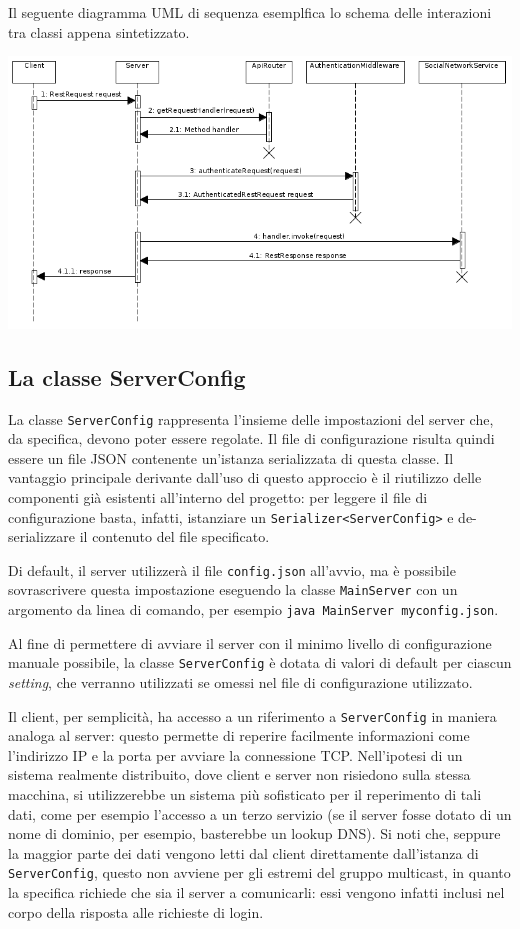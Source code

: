 \documentclass[a4paper,8pt]{article} %
\def\code#1{\texttt{#1}}
\begin{document}
\par Il seguente diagramma UML di sequenza esemplfica lo schema delle interazioni tra classi appena sintetizzato.
\par \includegraphics[width=\textwidth]{sequence.png}

\subsection{La classe ServerConfig}
La classe \code{ServerConfig} rappresenta l'insieme delle impostazioni del server che, da specifica, devono poter essere regolate.
Il file di configurazione risulta quindi essere un file JSON contenente un'istanza serializzata di questa classe. Il vantaggio principale derivante dall'uso di questo approccio è
il riutilizzo delle componenti già esistenti all'interno del progetto: per leggere il file di configurazione basta, infatti, istanziare un \code{Serializer<ServerConfig>} e de-serializzare il contenuto del file
specificato.
\par Di default, il server utilizzerà il file \code{config.json} all'avvio, ma è possibile sovrascrivere questa impostazione eseguendo la classe \code{MainServer} con un argomento da linea di comando, per esempio
\code{java MainServer myconfig.json}.

\par Al fine di permettere di avviare il server con il minimo livello di configurazione manuale possibile, la classe \code{ServerConfig} è dotata di valori di default per ciascun \emph{setting}, che verranno utilizzati
se omessi nel file di configurazione utilizzato.

\par Il client, per semplicità, ha accesso a un riferimento a \code{ServerConfig} in maniera analoga al server: questo permette di reperire facilmente informazioni come l'indirizzo IP e la porta per avviare la connessione TCP.
Nell'ipotesi di un sistema realmente distribuito, dove client e server non risiedono sulla stessa macchina, si utilizzerebbe un sistema più sofisticato per il reperimento di tali dati, come per esempio l'accesso a un terzo servizio (se
il server fosse dotato di un nome di dominio, per esempio, basterebbe un lookup DNS). Si noti che, seppure la maggior parte dei dati vengono letti dal client direttamente dall'istanza di \code{ServerConfig}, questo
non avviene per gli estremi del gruppo multicast, in quanto la specifica richiede che sia il server a comunicarli: essi vengono infatti inclusi nel corpo della risposta alle richieste di login.
\end{document}
